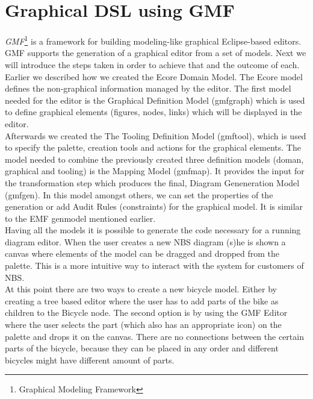 \section{Graphical DSL using GMF}
\label{sec.gmf}

\noindent \emph{GMF}\footnote{Graphical Modeling Framework} is a
framework for building modeling-like graphical Eclipse-based editors. \cite{Article_Introducing_GMF}
GMF supports the generation of a graphical editor from a set of models. Next we
will introduce the steps taken in order to achieve that and the outcome of
each.\\

\noindent Earlier we described how we created the Ecore Domain Model. The Ecore
model defines the non-graphical information managed by the editor. The first
model needed for the editor is the Graphical Definition Model (gmfgraph)
which is used to define graphical elements (figures, nodes, links) 
which will be displayed in the editor. \\

\noindent Afterwards we created the The Tooling Definition Model
(gmftool), which is used to specify the palette, creation tools and actions for
the graphical elements. The model needed to combine the previously
created three definition models (doman, graphical and tooling) is the Mapping
Model (gmfmap). It provides the input for the transformation step
which produces the final, Diagram Geneneration Model (gmfgen). In this model 
amongst others, we can set the properties of the generation or add Audit Rules
(constraints) for the graphical model. It is similar to the EMF genmodel
mentioned earlier. \cite{GMF_Tutorial} \\

\noindent Having all the models it is possible to generate the code necessary
for a running diagram editor. When the user creates a new NBS diagram 
(s)he is shown a canvas where elements of the model can be dragged 
and dropped from the palette. This is a more intuitive way to interact 
with the system for customers of NBS.\\

\noindent At this point there are two ways to create a new bicycle model. 
Either by creating a tree based editor where the user has to add 
parts of the bike as children to the Bicycle node. The second option 
is by using the GMF Editor where the user selects the part (which also 
has an appropriate icon) on the palette and drops it on the canvas.
There are no connections between the certain parts of the bicycle, 
because they can be placed in any order and different bicycles might 
have different amount of parts.\\

